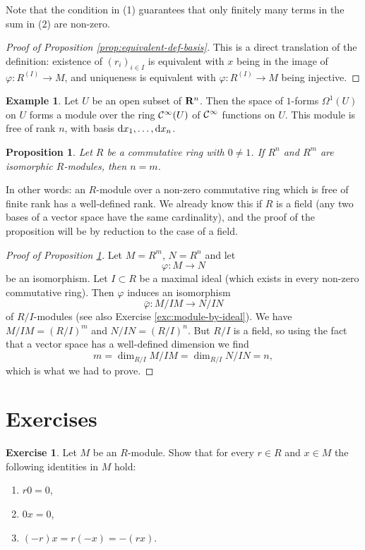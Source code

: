 \documentclass[11pt]{amsbook}
\theoremstyle{plain}
\newtheorem{proposition}[theorem]{Proposition}
\theoremstyle{definition}
\newtheorem{example}[theorem]{Example}
\newtheorem{exercise}{Exercise}
\begin{document}
Note that  the condition in (1) guarantees that only finitely many terms in the sum in (2) are non-zero.

\begin{proof}[Proof of Proposition \ref{prop:equivalent-def-basis}]
This is a direct translation of the definition: existence of $(r_i)_{i\in I}$ is equivalent with $x$ being in the image of $\varphi\colon R^{(I)}\to M$, and uniqueness is equivalent with $\varphi\colon R^{(I)} \to M$ being injective.
\end{proof}

\begin{example}
Let $U$ be an open subset of ${\mathbf{R}}^n$. Then the space of $1$-forms $\Omega^1(U)$ on $U$ forms a module over the ring ${\mathcal{C}}^\infty(U)$ of ${\mathcal{C}}^\infty$ functions on $U$. This module is free of rank $n$, with basis ${\rm d} x_1, \ldots, {\rm d}x_n$.
\end{example}


\begin{proposition}\label{prop:invariant-basis-number}
Let $R$ be a commutative ring with $0\neq 1$. If $R^n$ and $R^m$ are isomorphic $R$-modules, then $n=m$.
\end{proposition}

In other words: an $R$-module over a non-zero commutative ring which is free of finite rank has a well-defined rank. We already know this if $R$ is a field (any two bases of a vector space have the same cardinality), and the proof of the proposition will be by reduction to the case of a field.

\begin{proof}[Proof of Proposition \ref{prop:invariant-basis-number}]
Let $M=R^m$, $N=R^n$ and let
\[
	\varphi\colon M \to N
\]
be an isomorphism. Let $I \subset R$ be a maximal ideal (which exists in every non-zero commutative ring). Then $\varphi$ induces an isomorphism
\[
	\bar\varphi\colon M/IM \to N/IN
\]
of $R/I$-modules (see also Exercise \ref{exc:module-by-ideal}). We have $M/IM = (R/I)^m$ and $N/IN = (R/I)^n$. But $R/I$ is a field, so using
the fact that a vector space has a well-defined dimension we find
\[
	m = \dim_{R/I} M/IM = \dim_{R/I} N/IN = n,
\]
which is what we had to prove.
\end{proof}

\newpage
\section*{Exercises}


\begin{exercise}\label{exc:zeroes}
Let $M$ be an $R$-module. Show that for every $r\in R$ and $x\in M$ the following identities in $M$ hold:
\begin{enumerate}
\item $r0=0$,
\item $0x=0$,
\item  $(-r)x=r(-x)=-(rx)$.
\end{enumerate}
\end{exercise}
\end{document}
